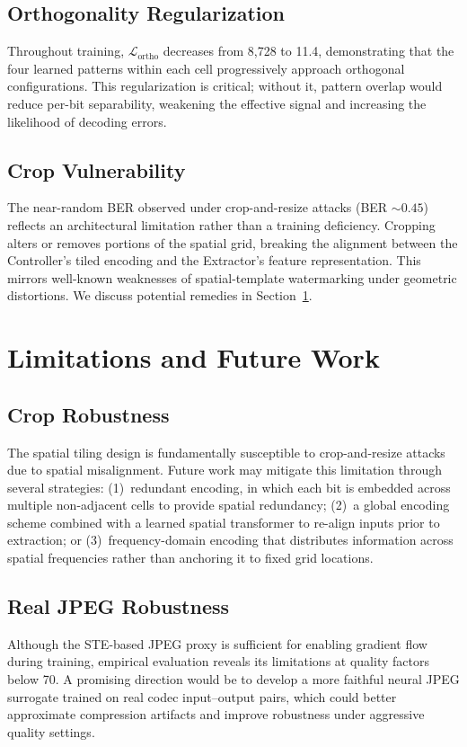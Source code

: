 \documentclass[conference]{IEEEtran}
\newcommand{\Lcal}{\mathcal{L}}
\begin{document}
\subsection{Orthogonality Regularization}
Throughout training, $\Lcal_\text{ortho}$ decreases from 8{,}728 to 11.4, demonstrating that the four learned patterns within each cell progressively approach orthogonal configurations.
This regularization is critical; without it, pattern overlap would reduce per-bit separability, weakening the effective signal and increasing the likelihood of decoding errors.

\subsection{Crop Vulnerability}
The near-random BER observed under crop-and-resize attacks (BER $\sim 0.45$) reflects an architectural limitation rather than a training deficiency.
Cropping alters or removes portions of the spatial grid, breaking the alignment between the Controller’s tiled encoding and the Extractor’s feature representation.
This mirrors well-known weaknesses of spatial-template watermarking under geometric distortions.
We discuss potential remedies in Section~\ref{sec:limitations}.


\section{Limitations and Future Work}
\label{sec:limitations}

\subsection{Crop Robustness}
The spatial tiling design is fundamentally susceptible to crop-and-resize attacks due to spatial misalignment.
Future work may mitigate this limitation through several strategies: (1)~redundant encoding, in which each bit is embedded across multiple non-adjacent cells to provide spatial redundancy; (2)~a global encoding scheme combined with a learned spatial transformer to re-align inputs prior to extraction; or (3)~frequency-domain encoding that distributes information across spatial frequencies rather than anchoring it to fixed grid locations.

\subsection{Real JPEG Robustness}
Although the STE-based JPEG proxy is sufficient for enabling gradient flow during training, empirical evaluation reveals its limitations at quality factors below 70.
A promising direction would be to develop a more faithful neural JPEG surrogate trained on real codec input--output pairs, which could better approximate compression artifacts and improve robustness under aggressive quality settings.
\end{document}
